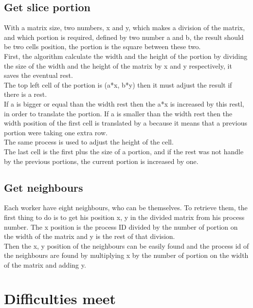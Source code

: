 \documentclass[a4paper,12pt]{article}
\begin{document}
\subsection{Get slice portion}
With a matrix size, two numbers, x and y, which makes a division of the matrix, and which portion is required, defined by two number a and b, the result should be two cells position, the portion is the square between these two.\\
First, the algorithm calculate the width and the height of the portion by dividing the size of the width and the height of the matrix by x and y respectively, it saves the eventual rest.\\
The top left cell of the portion is (a*x, b*y) then it must adjust the result if there is a rest.\\
If a is bigger or equal than the width rest then the a*x is increased by this restl, in order to translate the portion. If a is smaller than the width rest then the width position of the first cell is translated by a because it means that a previous portion were taking one extra row.\\
The same process is used to adjust the height of the cell.\\
The last cell is the first plus the size of a portion, and if the rest was not handle by the previous portions, the current portion is increased by one.
\subsection{Get neighbours}
Each worker have eight neighbours, who can be themselves. To retrieve them, the first thing to do is to get his position x, y in the divided matrix from his process number. The x position is the process ID divided by the number of portion on the width of the matrix and y is the rest of that division.\\
Then the x, y  position of the neighbours can be easily found and the process id of the neighbours are found by multiplying x by the number of portion on the width of the matrix and adding y.

\section{Difficulties meet}
\end{document}
